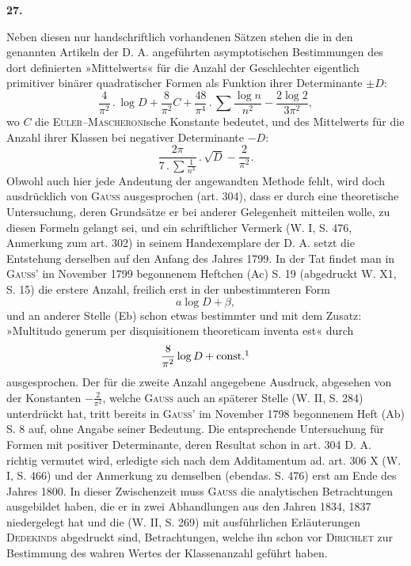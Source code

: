 \begin{center}\textbf{27.}\end{center}
\noindent\hspace*{\parindent}Neben diesen nur handschriftlich vorhandenen Sätzen stehen die in den genannten Artikeln der D. A. angeführten asymptotischen Bestimmungen des dort definierten »Mittelwerts« für die Anzahl der Geschlechter eigentlich primitiver binärer quadratischer Formen als Funktion ihrer Determinante \(\pm D\):
\[
\frac4{\pi^2}\mathbin{.}\log D+\frac8{\pi^2}C+\frac{48}{\pi^4}\mathbin{.}\sum\frac{\log n}{n^2}-\frac{2\log2}{3\pi^2},
\]
wo \(C\) die \textsc{Euler}–\textsc{Mascheroni}sche Konstante bedeutet, und des Mittelwerts für die Anzahl ihrer Klassen bei negativer Determinante \(-D\):
\[
\frac{2\pi}{7\mathbin{.}\displaystyle\sum\frac1{n^3}}\mathbin{.}\sqrt D-\frac2{\pi^2}.
\]
Obwohl auch hier jede Andeutung der angewandten Methode fehlt, wird doch ausdrücklich von \textsc{Gauss} ausgesprochen (art. 304), dass er durch eine theoretische Untersuchung, deren Grundsätze er bei anderer Gelegenheit mitteilen wolle, zu diesen Formeln gelangt sei, und ein schriftlicher Vermerk (W. I, S. 476, Anmerkung zum art. 302) in seinem Handexemplare der D. A. setzt die Entstehung derselben auf den Anfang des Jahres 1799. In der Tat findet man in \textsc{Gauss}’ im November 1799 begonnenem Heftchen (Ac) S. 19 (abgedruckt W. X1, S. 15) die erstere Anzahl, freilich erst in der unbestimmteren Form
\newpage{}
\[
a\log D+\beta,
\]
und an anderer Stelle (Eb) schon etwas bestimmter und mit dem Zusatz: »Multitudo generum per disquisitionem theoreticam inventa est« durch
\[
\frac8{\pi^2}\log D+\mathrm{const.}\footnotemark
\]
ausgesprochen. Der für die zweite Anzahl angegebene Ausdruck, abgesehen von der Konstanten \(-\frac2{\pi^2}\), welche \textsc{Gauss} auch an späterer Stelle (W. II, S. 284) unterdrückt hat, tritt bereits in \textsc{Gauss}’ im November 1798 begonnenem Heft (Ab) S. 8 auf, ohne Angabe seiner Bedeutung. Die entsprechende Untersuchung für Formen mit positiver Determinante, deren Resultat schon in art. 304 D. A. richtig vermutet wird, erledigte sich nach dem Additamentum ad. art. 306 X (W. I, S. 466) und der Anmerkung zu demselben (ebendas. S. 476) erst am Ende des Jahres 1800. In dieser Zwischenzeit muss \textsc{Gauss} die analytischen Betrachtungen ausgebildet haben, die er in zwei Abhandlungen aus den Jahren 1834, 1837 niedergelegt hat und die (W. II, S. 269) mit ausführlichen Erläuterungen \textsc{Dedekinds} abgedruckt sind, Betrachtungen, welche ihn schon vor \textsc{Dirichlet} zur Bestimmung des wahren Wertes der Klassenanzahl geführt haben.

